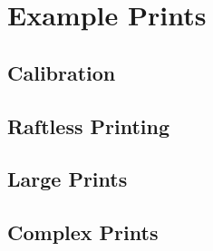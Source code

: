 \chapter{Example Prints}
	
	\section{Calibration}
	
	\section{Raftless Printing}
	
	\section{Large Prints}
	
	\section{Complex Prints}

